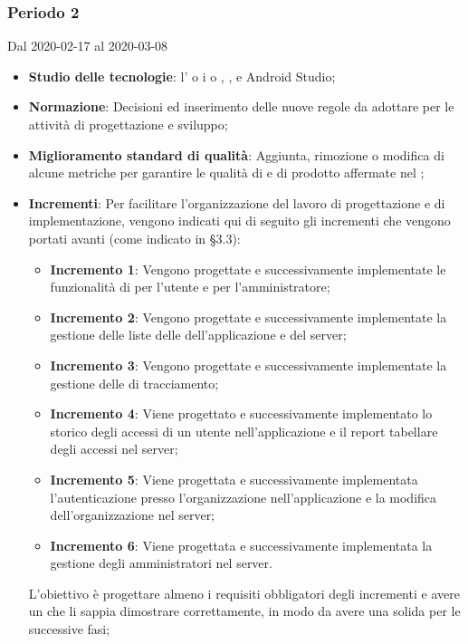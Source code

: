 \subsubsection{Periodo 2} 
Dal 2020-02-17 al 2020-03-08
\begin{itemize}
	\item \textbf{Studio delle tecnologie}: l'  o i   o , ,  e Android Studio;
	\item \textbf{Normazione}: Decisioni ed inserimento delle nuove regole da adottare per le attività di progettazione e sviluppo;
	\item \textbf{Miglioramento standard di qualità}: Aggiunta, rimozione o modifica di alcune metriche per garantire le qualità di  e di prodotto affermate nel \PdQ{};
	\item \textbf{Incrementi}: Per facilitare l'organizzazione del lavoro di progettazione e di implementazione, vengono indicati qui di seguito gli incrementi che vengono portati avanti (come indicato in §3.3):
		\begin{itemize}
			\item \textbf{Incremento 1}: Vengono progettate e successivamente implementate le funzionalità di  per l'utente e per l'amministratore;
			\item \textbf{Incremento 2}: Vengono progettate e successivamente implementate la gestione delle liste delle  dell'applicazione e del server;
			\item \textbf{Incremento 3}: Vengono progettate e successivamente implementate la gestione delle  di tracciamento;
			\item \textbf{Incremento 4}: Viene progettato e successivamente implementato lo storico degli accessi di un utente nell'applicazione e il report tabellare degli accessi nel server;
			\item \textbf{Incremento 5}: Viene progettata e successivamente implementata l'autenticazione presso l'organizzazione nell'applicazione e la modifica dell'organizzazione nel server;
			\item \textbf{Incremento 6}: Viene progettata e successivamente implementata la gestione degli amministratori nel server.
		\end{itemize}
		L'obiettivo è progettare almeno i requisiti obbligatori degli incrementi e avere un  che li sappia dimostrare correttamente, in modo da avere una solida  per le successive fasi;

\end{itemize}
